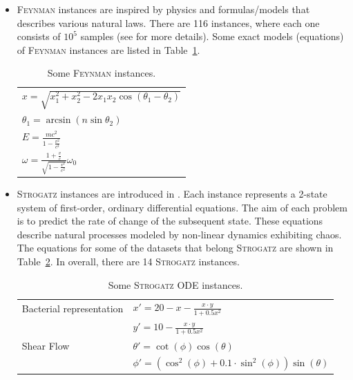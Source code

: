 \documentclass{bmcart}
\begin{document}
\begin{itemize}
	\item \textsc{Feynman} instances are inspired by physics and formulas/models that describes various natural laws.  
	There are 116 instances, where each one consists of $10^5$  samples (see \cite{udrescu2020ai} for more details). Some exact models (equations) of \textsc{Feynman} instances are listed in Table~\ref{tab:Feynamn-Eq}.  
	
	\begin{table}[!ht]
		\centering
		\begin{tabular}{l}   \hline
			$x = \sqrt{x_1^2 + x_2^2 - 2 x_1 x_2 \cos(\theta_1 - \theta_2)}$ \\
			$ \theta_1 = \arcsin(n \sin \theta_2)$ \\
			$E =  \frac{m c^2 }{1 - \frac{v^2}{c^2}}$ \\
			$\omega = \frac{1 + \frac{v}{c}}{ \sqrt{1 - \frac{v^2}{c^2}}} \omega_0$ \\ \hline
			
		\end{tabular}
		\caption{Some \textsc{Feynman} instances.}
		\label{tab:Feynamn-Eq}
	\end{table}
	
	\item \textsc{Strogatz} instances are introduced in \cite{la2016inference}. 
	Each instance represents a 2-state system of first-order, ordinary differential equations. 
	The aim of each problem is to predict the rate of change of the subsequent state. These equations describe natural processes modeled by non-linear dynamics exhibiting chaos.  The equations for some of the datasets that belong \textsc{Strogatz} are shown in Table~\ref{table:strogatz-ODEs}. In overall, there are 14 \textsc{Strogatz} instances. 
	
	
	\begin{table}
		\centering
		\begin{tabular}{ll} \\ \hline
			Bacterial representation &   $x' = 20 - x - \frac{x \cdot y}{1 + 0.5 x^2 }$ \\ 
			&   $y' = 10 - \frac{x \cdot y}{1 + 0.5 x^2  }$ \\ \hline
			Shear Flow               &  $\theta' = \cot(\phi)\cos(\theta)$ \\
			&  $ \phi'  = ( \cos^2(\phi) + 0.1 \cdot \sin^2 (\phi)) \sin(\theta) $ \\ \hline
		\end{tabular}
		\caption{Some \textsc{Strogatz} ODE instances.}
		\label{table:strogatz-ODEs}
	\end{table}
	
\end{itemize}
\end{document}
